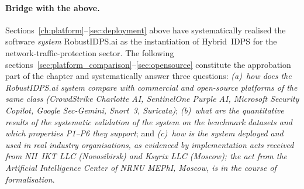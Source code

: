 
\paragraph{Bridge with the above.}Sections~\ref{ch:platform}--\ref{sec:deployment} above
have systematically realised the software \emph{system}
\textsf{RobustIDPS.ai} as the instantiation of Hybrid~IDPS for the
network-traffic-protection sector. The following
sections~\ref{sec:platform_comparison}--\ref{sec:opensource}
constitute the approbation part of the chapter and systematically
answer three questions:
\emph{(a)~how does the \textsf{RobustIDPS.ai} system compare with
commercial and open-source platforms of the same class
(CrowdStrike Charlotte AI, SentinelOne Purple AI, Microsoft
Security Copilot, Google Sec-Gemini, Snort~3, Suricata)};
\emph{(b)~what are the quantitative results of the systematic
validation of the system on the benchmark datasets and which
properties P1--P6 they support}; and
\emph{(c)~how is the system deployed and used in real industry
organisations, as evidenced by implementation acts received from
NII~IKT LLC (Novosibirsk) and Ksyrix LLC (Moscow); the act from
the Artificial Intelligence Center of NRNU MEPhI, Moscow, is in
the course of formalisation}.

\label{sec:platform_comparison}%

